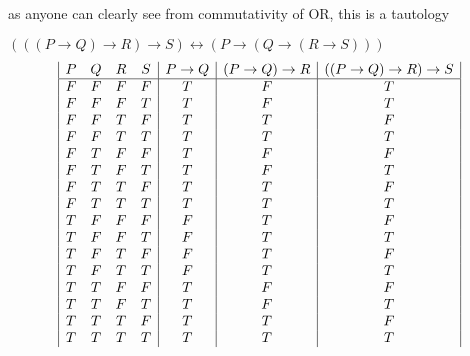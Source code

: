 \documentclass[a4paper,12pt]{article}
\begin{document}
as anyone can clearly see from commutativity of OR, this is a tautology

$(((P \rightarrow Q) \rightarrow R) \rightarrow S) \leftrightarrow (P \rightarrow (Q \rightarrow (R \rightarrow S)))$\\
\begin{displaymath}
\begin {array} {|c c c c|c|c|c|c|c}
P & Q & R & S & 
P \rightarrow Q &
(P \rightarrow Q) \rightarrow R &
((P \rightarrow Q) \rightarrow R) \rightarrow S \\
\hline

F & F & F & F & T & F & T\\
F & F & F & T & T & F & T\\
F & F & T & F & T & T & F\\
F & F & T & T & T & T & T\\
F & T & F & F & T & F & F\\
F & T & F & T & T & F & T\\
F & T & T & F & T & T & F\\
F & T & T & T & T & T & T\\
T & F & F & F & F & T & F\\
T & F & F & T & F & T & T\\
T & F & T & F & F & T & F\\
T & F & T & T & F & T & T\\
T & T & F & F & T & F & F\\
T & T & F & T & T & F & T\\
T & T & T & F & T & T & F\\
T & T & T & T & T & T & T\\

\end{array}
\end{displaymath}
\end{document}
